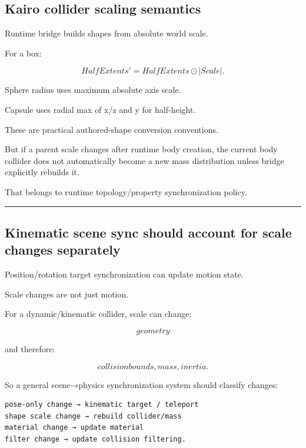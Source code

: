\subsection{Kairo collider scaling semantics}\label{06-engine-ii-ch038-kairo-collider-scaling-semantics}

\hypertarget{06-engine-ii-ch038-kairo-collider-scaling-semantics}{}

Runtime bridge builds shapes from absolute world scale.

For a box:

\[
HalfExtents'
=
HalfExtents\odot|Scale|.
\]

Sphere radius uses maximum absolute axis scale.

Capsule uses radial max of x/z and y for half-height.

These are practical authored-shape conversion conventions.

But if a parent scale changes after runtime body creation, the current body collider does not automatically become a new mass distribution unless bridge explicitly rebuilds it.

That belongs to runtime topology/property synchronization policy.

\begin{center}\rule{0.5\linewidth}{0.5pt}\end{center}

\subsection{Kinematic scene sync should account for scale changes separately}\label{06-engine-ii-ch038-kinematic-scene-sync-should-account-for-scale-changes-separately}

\hypertarget{06-engine-ii-ch038-kinematic-scene-sync-should-account-for-scale-changes-separately}{}

Position/rotation target synchronization can update motion state.

Scale changes are not just motion.

For a dynamic/kinematic collider, scale can change:

\[
geometry
\]

and therefore:

\[
collision bounds,
mass,
inertia.
\]

So a general scene→physics synchronization system should classify changes:

\begin{verbatim}
pose-only change → kinematic target / teleport
shape scale change → rebuild collider/mass
material change → update material
filter change → update collision filtering.
\end{verbatim}

